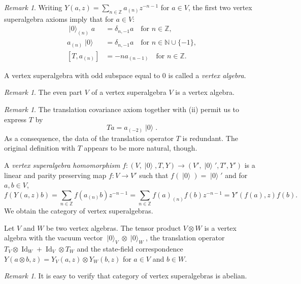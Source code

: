 \documentclass[a4paper, 12pt, reqno]{amsart}
\theoremstyle{remark}
\newtheorem{remark}[theorem]{Remark}
\numberwithin{equation}{subsection}
\DeclareMathOperator{\Id}{Id}
\DeclareMathOperator{\vac}{|0\rangle}
\DeclareMathOperator{\zero}{\overline{0}}
\begin{document}
\begin{remark}
  \label{rmk:9}
  Writing $Y(a, z) = \sum_{n \in \mathbb{Z}}a_{(n)}z^{-n - 1}$ for $a \in V$, the first two vertex superalgebra axioms imply that for $a \in V$:
  \begin{align*}
    \vac_{(n)}a &= \delta_{n, -1}a \quad \text{for }n \in \mathbb{Z}, \\
    a_{(n)}\vac &= \delta_{n, -1}a \quad \text{for }n \in \mathbb{N} \cup \{-1\}, \\
    [T, a_{(n)}] &= -na_{(n - 1)} \quad \text{for }n \in \mathbb{Z}.
  \end{align*}
\end{remark}

A vertex superalgebra with odd subspace equal to $0$ is called a \emph{vertex algebra}.

\begin{remark}
  \label{rmk:10}
  The even part $V_{\zero}$ of a vertex superalgebra $V$ is a vertex algebra.
\end{remark}

\begin{remark}
  \label{rmk:11}
  The translation covariance axiom together with (ii) permit us to express $T$ by
  \begin{equation}
    \label{eq:12}
    Ta = a_{(-2)}\vac.
  \end{equation}
  As a consequence, the data of the translation operator $T$ is redundant.
  The original definition with $T$ appears to be more natural, though.
\end{remark}

A \emph{vertex superalgebra homomorphism} $f: (V, \vac, T, Y) \to (V', \vac', T', Y')$ is a linear and parity preserving map $f: V \to V'$ such that $f(\vac) = \vac'$ and for $a, b \in V$,
\begin{equation*}
  f(Y(a, z)b) = \sum_{n \in \mathbb{Z}}f(a_{(n)}b)z^{-n - 1} = \sum_{n \in \mathbb{Z}}f(a)_{(n)}f(b)z^{-n - 1} = Y'(f(a), z)f(b).
\end{equation*}
We obtain the category of vertex superalgebras.

Let $V$ and $W$ be two vertex algebras.
The tensor product $V \otimes W$ is a vertex algebra with the vacuum vector $\vac_V\otimes \vac_W$, the translation operator $T_V\otimes \Id_W + \Id_V\otimes T_W$ and the state-field correspondence $Y(a\otimes b, z) = Y_V(a, z)\otimes Y_W(b, z)$ for $a \in V$ and $b \in W$.

\begin{remark}
  \label{rmk:12}
  It is easy to verify that category of vertex superalgebras is abelian.
\end{remark}
\end{document}
